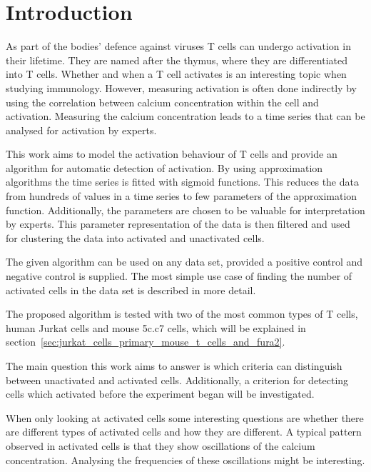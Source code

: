 \chapter{Introduction}
\label{chapter:introduction}

As part of the bodies' defence against viruses T cells can undergo activation in their lifetime. They are named after the thymus, where they are differentiated into T cells. Whether and when a T cell activates is an interesting topic when studying immunology. However, measuring activation is often done indirectly by using the correlation between calcium concentration within the cell and activation. Measuring the calcium concentration leads to a time series that can be analysed for activation by experts.

This work aims to model the activation behaviour of T cells and provide an algorithm for automatic detection of activation. By using approximation algorithms the time series is fitted with sigmoid functions. This reduces the data from hundreds of values in a time series to few parameters of the approximation function. Additionally, the parameters are chosen to be valuable for interpretation by experts. This parameter representation of the data is then filtered and used for clustering the data into activated and unactivated cells.

The given algorithm can be used on any data set, provided a positive control and negative control is supplied. The most simple use case of finding the number of activated cells in the data set is described in more detail.

The proposed algorithm is tested with two of the most common types of T cells, human Jurkat cells and mouse 5c.c7 cells, which will be explained in section~\ref{sec:jurkat_cells_primary_mouse_t_cells_and_fura2}.

\vspace*{0.7cm}
\noindent
The main question this work aims to answer is which criteria can distinguish between unactivated and activated cells. Additionally, a criterion for detecting cells which activated before the experiment began will be investigated.

When only looking at activated cells some interesting questions are whether there are different types of activated cells and how they are different. A typical pattern observed in activated cells is that they show oscillations of the calcium concentration. Analysing the frequencies of these oscillations might be interesting.

